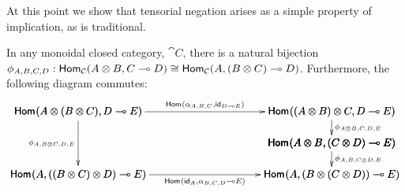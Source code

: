 At this point we show that tensorial negation arises as a simple
property of implication, as is traditional.
\begin{lemma}
  \label{lemma:monoidal-fact1}
  In any monoidal closed category, $\cat{C}$, there is a natural bijection
  $\phi_{A,B,C,D} : \mathsf{Hom}_{\mathcal{C}}(A \otimes B,C \multimap D) \cong \mathsf{Hom}_{\mathcal{C}}(A,(B \otimes C) \multimap D)$.
  Furthermore, the following diagram commutes:
  \[
  \bfig
  \morphism(0,85)|l|/<-/<0,480>[`;\phi_{A,B \otimes C,D,E}]
  \vSquares/->``->```->`->/<300,300>%
              [\homs{}{A \otimes (B \otimes C)}{D \limp E}`%
                \homs{}{(A \otimes B) \otimes C}{D \limp E}``%
                \homs{}{A \otimes B}{(C \otimes D) \limp E}`%
                \homs{}{A}{((B \otimes C) \otimes D) \limp E}`%
                \homs{}{A}{(B \otimes (C \otimes D)) \limp E};%
                \homs{}{\alpha_{A,B,C}}{\id_{D \limp E}}``%
                \phi_{A \otimes B,C,D,E}```%
                \phi_{A,B,C \otimes D,E}`%
                \homs{}{\id_{A}}{\alpha_{B,C,D} \limp E}]
  \efig
  \]
\end{lemma}
